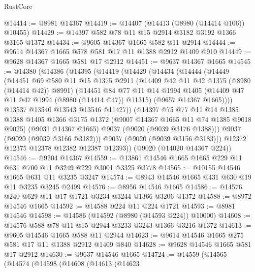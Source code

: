 \begin{lexlean}{RustCore}
\begin{coremodule}
@14414 := @8981 @14367
@14419 := @14407 (@14413 (@8980 (@14414 @106)) @10455)
@14429 := @14397 @582 @78 @11 @15 @2914 @3182 @3192 @1366 @3165 @1372
@14434 := @9605 @14367 @1665 @582 @11 @2914
@14444 := @9614 @14367 @1665 @578 @581 @17 @11 @1388 @2912 @1409 @910
@14449 := @9628 @14367 @1665 @581 @17 @2912
@14451 := @9637 @14367 @1665
@14545 := @14380
    (@14386
      (@14395
        (@14419
          (@14429
            (@14434
              (@14444
                (@14449
                  (@14451
                    @69
                    @580
                    @11
                    @15
                    @1375
                    @2911
                    (@14409 @42 @11 @42 @1375 (@8980 (@14414 @42)) @8991)
                    (@14451
                      @84
                      @77
                      @11
                      @14
                      @1994
                      @1405
                      (@14409 @47 @11 @47 @1994 (@8980 (@14414 @47)) @11315)
                      (@9657 @14367 @1665))))
                @13537
                @13540
                @13543
                @13546
                @11427))
            (@14397
              @75
              @77
              @11
              @14
              @1385
              @1388
              @1405
              @1366
              @3175
              @1372
              (@9007 @14367 @1665 @11 @74 @1385 @9018 @9025)
              (@9031 @14367 @1665)
              @9037
              (@9020 (@9039 @3176 @1388)))
            @9037
            (@9020 (@9039 @3166 @3182)))
          @9037
          (@9020 (@9039 @3156 @3183)))
        @12372
        @12375
        @12378
        @12382
        @12387
        @12393))
    (@9020 (@14020 @14367 @224))
@14546 := @9204 @14367
@14559 := @13861 @14546 @1665 @1665 @229 @11 @631 @700 @11 @3249 @229 @3001 @3325 @3778
@14565 := @10155 @14546 @1665 @631 @11 @3235 @3247
@14574 := @8943 @14546 @1665 @431 @630 @19 @11 @3235 @3245 @2499
@14576 := @8956 @14546 @1665
@14586 := @14576 @240 @629 @11 @17 @1721 @3234 @3244 @1366 @3206 @1372
@14588 := @8972 @14546 @1665
@14592 := @14588 @224 @11 @224 @1721
@14593 := @8981 @14546
@14598 := @14586 (@14592 (@8980 (@14593 @224)) @10000)
@14608 := @14576 @588 @78 @11 @15 @2944 @3233 @3243 @1366 @3216 @1372
@14613 := @9605 @14546 @1665 @588 @11 @2944
@14623 := @9614 @14546 @1665 @275 @581 @17 @11 @1388 @2912 @1409 @840
@14628 := @9628 @14546 @1665 @581 @17 @2912
@14630 := @9637 @14546 @1665
@14724 := @14559
    (@14565
      (@14574
        (@14598
          (@14608
            (@14613
              (@14623

\end{coremodule}
\end{lexlean}
